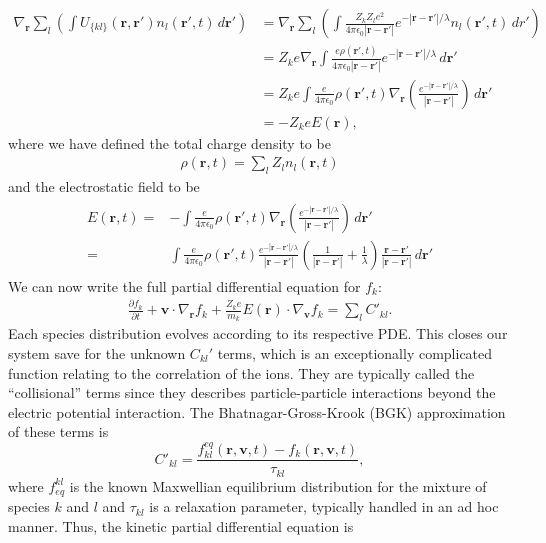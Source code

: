 \documentclass{article}
\begin{document}
\begin{align*}
\nabla_\mathbf{r}\sum_l\left(\int U_{\{kl\}}(\mathbf{r},\mathbf{r}') n_l(\mathbf{r}',t)\,d\mathbf{r}'\right)&=\nabla_\mathbf{r}\sum_l\left(\int \frac{Z_kZ_le^2}{4\pi \epsilon_0|\mathbf{r}-\mathbf{r}'|}e^{-|\mathbf{r}-\mathbf{r}'|/\lambda}n_l(\mathbf{r}',t)\,dr'\right)\\
&=Z_ke\nabla_\mathbf{r}\int\frac{e\rho(\mathbf{r}',t)}{4\pi\epsilon_0|\mathbf{r}-\mathbf{r}'|}e^{-|\mathbf{r}-\mathbf{r}'|/\lambda}\,d\mathbf{r}'\\
&=Z_ke\int\frac{e}{4\pi\epsilon_0}\rho(\mathbf{r}',t)\nabla_\mathbf{r}\left(\frac{e^{-|\mathbf{r}-\mathbf{r}'|/\lambda}}{|\mathbf{r}-\mathbf{r}'|}\right)\,d\mathbf{r}'\\
&=-Z_keE(\mathbf{r}),
\end{align*}where we have defined the total charge density to be
\begin{align}\rho(\mathbf{r},t)=\sum_l Z_ln_l(\mathbf{r},t)
\end{align}and the electrostatic field to be
\begin{align}\begin{split}E(\mathbf{r},t)=&-\int\frac{e}{4\pi\epsilon_0}\rho(\mathbf{r}',t)\nabla_\mathbf{r}\left(\frac{e^{-|\mathbf{r}-\mathbf{r}'|/\lambda}}{|\mathbf{r}-\mathbf{r}'|}\right)\,d\mathbf{r}'\\=&\int\frac{e}{4\pi\epsilon_0}\rho(\mathbf{r}',t)\frac{e^{-|\mathbf{r}-\mathbf{r}'|/\lambda}}{|\mathbf{r}-\mathbf{r}'|}\left(\frac{1}{|\mathbf{r}-\mathbf{r}'|}+\frac{1}{\lambda}\right)\frac{\mathbf{r}-\mathbf{r}'}{|\mathbf{r}-\mathbf{r}'|}\,d\mathbf{r}'
\end{split}\end{align}We can now write the full partial differential equation for $f_k$:
\begin{align*}
\frac{\partial f_k}{\partial t}+\mathbf{v}\cdot\nabla_\mathbf{r}f_k+\frac{Z_ke}{m_k}E(\mathbf{r})\cdot\nabla_\mathbf{v}f_k=\sum_l C'_{kl}.
\end{align*}
Each species distribution evolves according to its respective PDE. This closes our system save for the unknown $C_{kl}'$ terms, which is an exceptionally complicated function relating to the correlation of the ions. They are typically called the ``collisional'' terms since they describes particle-particle interactions beyond the electric potential interaction. The Bhatnagar-Gross-Krook (BGK) approximation of these terms is 
\[C'_{kl}=\frac{f_{kl}^{eq}(\mathbf{r},\mathbf{v},t)-f_k(\mathbf{r},\mathbf{v},t)}{\tau_{kl}},
\]where $f_{eq}^{kl}$ is the known Maxwellian equilibrium distribution for the mixture of species $k$ and $l$ and $\tau_{kl}$ is a relaxation parameter, typically handled in an ad hoc manner. Thus, the kinetic partial differential equation is
\end{document}
